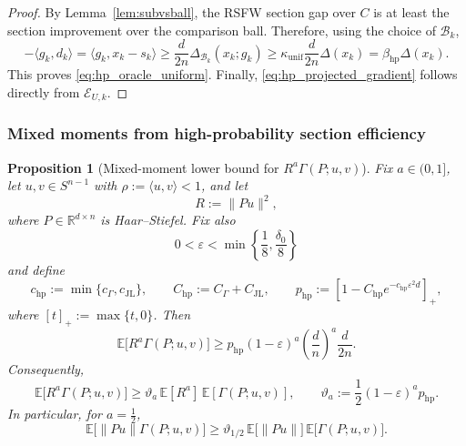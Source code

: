 \documentclass{article}
\newtheorem{proposition}{Proposition}
\begin{document}
\begin{proof}
By Lemma~\ref{lem:subvsball}, the RSFW section gap over \(C\) is at least the
section improvement over the comparison ball. Therefore, using the choice of
\(\mathcal B_k\),
\[
-\langle g_k,d_k\rangle
=
\langle g_k,x_k-s_k\rangle
\ge
\frac d{2n}\Delta_{\mathcal B_k}(x_k;g_k)
\ge
\kappa_{\mathrm{unif}}\frac d{2n}\Delta(x_k)
=
\beta_{\mathrm{hp}}\Delta(x_k).
\]
This proves \eqref{eq:hp_oracle_uniform}. Finally,
\eqref{eq:hp_projected_gradient} follows directly from \(\mathcal E_{U,k}\).
\end{proof}

\subsubsection{Mixed moments from high-probability section efficiency}

\begin{proposition}[Mixed-moment lower bound for \(R^a\Gamma(P;u,v)\)]
\label{prop:pos_corr_general}
Fix \(a\in(0,1]\), let \(u,v\in S^{n-1}\) with
\(\rho:=\langle u,v\rangle <1\), and let
\[
R:=\|Pu\|^2,
\]
where \(P\in\mathbb R^{d\times n}\) is Haar--Stiefel. Fix also
\[
0<\varepsilon<\min\!\left\{\frac18,\frac{\delta_0}{8}\right\}
\]
and define
\[
c_{\mathrm{hp}}:=\min\{c_{\Gamma},c_{\mathrm{JL}}\},
\qquad
C_{\mathrm{hp}}:=C_{\Gamma}+C_{\mathrm{JL}},
\qquad
p_{\mathrm{hp}}
:=
\left[
1-C_{\mathrm{hp}}e^{-c_{\mathrm{hp}}\varepsilon^2d}
\right]_+,
\]
where \([t]_+:=\max\{t,0\}\). Then
\begin{equation}
\mathbb E\bigl[R^a\Gamma(P;u,v)\bigr]
\ge
p_{\mathrm{hp}}(1-\varepsilon)^a
\left(\frac dn\right)^a
\frac{d}{2n}.
\label{eq:mixed_direct_lower}
\end{equation}
Consequently,
\begin{equation}
\mathbb E\bigl[R^a\Gamma(P;u,v)\bigr]
\ge
\vartheta_a\,\mathbb E[R^a]\,\mathbb E[\Gamma(P;u,v)],
\qquad
\vartheta_a:=\frac12(1-\varepsilon)^a p_{\mathrm{hp}}.
\label{eq:mixed_vs_product}
\end{equation}
In particular, for \(a=\tfrac12\),
\begin{equation}
\mathbb E\bigl[\|Pu\|\Gamma(P;u,v)\bigr]
\ge
\vartheta_{1/2}\,
\mathbb E\bigl[\|Pu\|\bigr]\,
\mathbb E\bigl[\Gamma(P;u,v)\bigr].
\label{eq:pos_corr_Gamma}
\end{equation}
\end{proposition}
\end{document}
